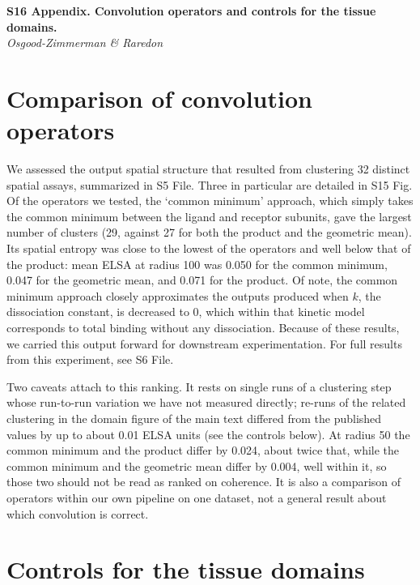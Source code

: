 \documentclass[10pt]{article}
\begin{document}
\begin{center}
{\large\bfseries S16 Appendix. Convolution operators and controls for the tissue domains.}\\[4pt]
\emph{Osgood-Zimmerman \& Raredon}
\end{center}
\section*{Comparison of convolution operators}


We assessed the output spatial structure that resulted from clustering 32 distinct spatial assays, summarized in S5 File. Three in particular are detailed in S15 Fig. Of the operators we tested, the `common minimum' approach, which simply takes the common minimum between the ligand and receptor subunits, gave the largest number of clusters (29, against 27 for both the product and the geometric mean). Its spatial entropy was close to the lowest of the operators and well below that of the product: mean ELSA at radius 100 was 0.050 for the common minimum, 0.047 for the geometric mean, and 0.071 for the product. Of note, the common minimum approach closely approximates the outputs produced when $k$, the dissociation constant, is decreased to 0, which within that kinetic model corresponds to total binding without any dissociation. Because of these results, we carried this output forward for downstream experimentation. For full results from this experiment, see S6 File.

Two caveats attach to this ranking. It rests on single runs of a clustering step whose run-to-run variation we have not measured directly; re-runs of the related clustering in the domain figure of the main text differed from the published values by up to about 0.01 ELSA units (see the controls below). At radius 50 the common minimum and the product differ by 0.024, about twice that, while the common minimum and the geometric mean differ by 0.004, well within it, so those two should not be read as ranked on coherence. It is also a comparison of operators within our own pipeline on one dataset, not a general result about which convolution is correct.


\section*{Controls for the tissue domains}
\end{document}

